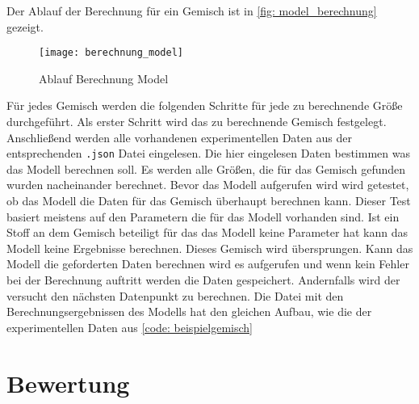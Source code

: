 \documentclass[../thesis.tex]{subfiles}
\begin{document}
Der Ablauf der Berechnung für ein Gemisch ist in \autoref{fig: model_berechnung} gezeigt.

\begin{figure}[htb]
	\centering
	\texttt{[image: berechnung\_model]}
	\caption{Ablauf Berechnung Model}
	\label{fig: model_berechnung}
\end{figure}

Für jedes Gemisch werden die folgenden Schritte für jede zu berechnende Größe durchgeführt. Als erster Schritt wird das zu berechnende Gemisch festgelegt. Anschließend werden alle vorhandenen experimentellen Daten aus der entsprechenden \texttt{.json} Datei eingelesen. Die hier eingelesen Daten bestimmen was das Modell berechnen soll. Es werden alle Größen, die für das Gemisch gefunden wurden nacheinander berechnet. Bevor das Modell aufgerufen wird wird getestet, ob das Modell die Daten für das Gemisch überhaupt berechnen kann. Dieser Test basiert meistens auf den Parametern die für das Modell vorhanden sind. Ist ein Stoff an dem Gemisch beteiligt für das das Modell keine Parameter hat kann das Modell keine Ergebnisse berechnen. Dieses Gemisch wird übersprungen.
Kann das Modell die geforderten Daten berechnen wird es aufgerufen und wenn kein Fehler bei der Berechnung auftritt werden die Daten gespeichert. Andernfalls wird der versucht den nächsten Datenpunkt zu berechnen. Die Datei mit den Berechnungsergebnissen des Modells hat den gleichen Aufbau, wie die der experimentellen Daten aus \autoref{code: beispielgemisch}

\section{Bewertung}
\end{document}
